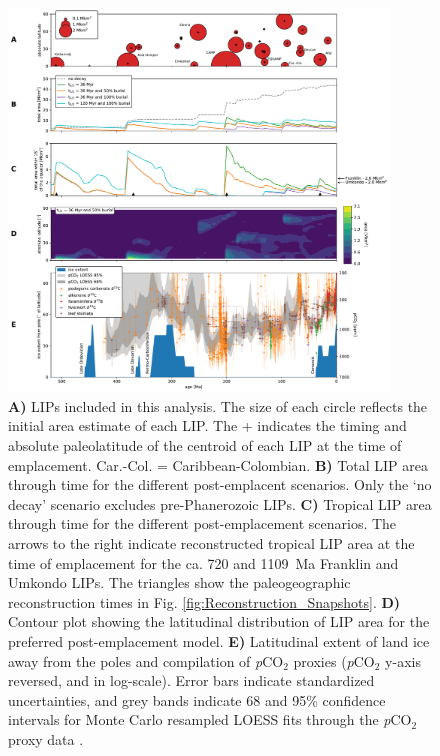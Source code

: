\documentclass[11pt,letterpaper]{article}
\begin{document}
\begin{figure}[h!]
\begin{center}
	\includegraphics[width=0.9\textwidth]{Manuscript/Figures/LIP_Areas.pdf}
	\caption{\textbf{A)} LIPs included in this analysis. The size of each circle reflects the initial area estimate of each LIP. The + indicates the timing and absolute paleolatitude of the centroid of each LIP at the time of emplacement. Car.-Col. = Caribbean-Colombian. \textbf{B)} Total LIP area through time for the different post-emplacent scenarios. Only the `no decay' scenario excludes pre-Phanerozoic LIPs. \textbf{C)} Tropical LIP area through time for the different post-emplacement scenarios. The arrows to the right indicate reconstructed tropical LIP area at the time of emplacement for the ca. 720 and 1109~Ma Franklin and Umkondo LIPs. The triangles show the paleogeographic reconstruction times in Fig. \ref{fig:Reconstruction_Snapshots}. \textbf{D)} Contour plot showing the latitudinal distribution of LIP area for the preferred post-emplacement model. \textbf{E)} Latitudinal extent of land ice away from the poles \citep{Macdonald2019a} and compilation of \textit{p}CO$_{2}$ proxies \citep{Foster2017a} (\textit{p}CO$_{2}$ y-axis reversed, and in log-scale). Error bars indicate standardized uncertainties, and grey bands indicate 68 and 95\% confidence intervals for Monte Carlo resampled LOESS fits through the \textit{p}CO$_{2}$ proxy data \citep{Foster2017a}.}
	\label{fig:LIP_Areas}
\end{center}
\end{figure}
\end{document}
